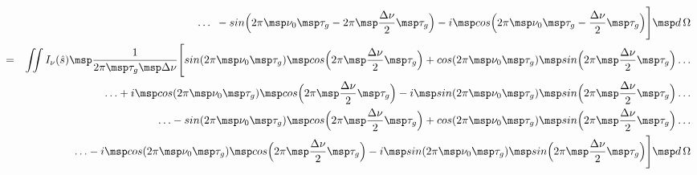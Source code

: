 \begin{eqnarray}
&& \dotso \enspace - sin\Big (2\pi \msp \nu_ 0 \msp \tau _g - 2\pi \msp \frac{\Delta \nu }{2} \msp \tau _g\Big ) - i \msp cos\Big (2\pi \msp \nu_ 0 \msp \tau _g - \frac{\Delta \nu }{2} \msp \tau _g\Big )\Bigg ] \msp d\,\Omega \nonumber \\
&=& \iint I_\nu (\hat{s}) \msp \frac{1}{2\pi \msp \tau _g \msp \Delta \nu} \Bigg [sin (2\pi \msp \nu_ 0 \msp \tau _g) \msp cos\Big (2\pi \msp \frac{\Delta \nu }{2} \msp \tau _g\Big ) + cos(2\pi \msp \nu_ 0 \msp \tau _g) \msp sin\Big (2\pi \msp \frac{\Delta \nu }{2} \msp \tau _g\Big ) \dotso \nonumber \\
&& \dotso + i \msp cos (2\pi \msp \nu_ 0 \msp \tau _g) \msp cos\Big (2\pi \msp \frac{\Delta \nu }{2} \msp \tau _g\Big ) - i \msp sin(2\pi \msp \nu_ 0 \msp \tau _g) \msp sin\Big (2\pi \msp \frac{\Delta \nu }{2} \msp \tau _g\Big ) \dotso \nonumber \\
&& \dotso - sin (2\pi \msp \nu_ 0 \msp \tau _g) \msp cos\Big (2\pi \msp \frac{\Delta \nu }{2} \msp \tau _g\Big ) + cos(2\pi \msp \nu_ 0 \msp \tau _g) \msp sin\Big (2\pi \msp \frac{\Delta \nu }{2} \msp \tau _g\Big ) \dotso \nonumber \\
&& \dotso - i \msp cos (2\pi \msp \nu_ 0 \msp \tau _g) \msp cos\Big (2\pi \msp \frac{\Delta \nu }{2} \msp \tau _g\Big ) - i \msp sin(2\pi \msp \nu_ 0 \msp \tau _g) \msp sin\Big (2\pi \msp \frac{\Delta \nu }{2} \msp \tau _g\Big )\Bigg ] \msp d\,\Omega \nonumber
\end{eqnarray}

